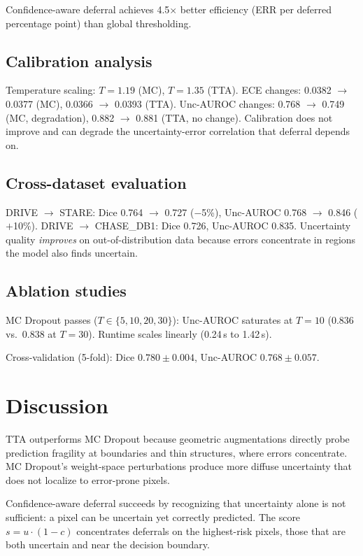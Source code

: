 \documentclass[journal]{IEEEtran}
\begin{document}
Confidence-aware deferral achieves 4.5$\times$ better efficiency (ERR per
deferred percentage point) than global thresholding.

\subsection{Calibration analysis}

Temperature scaling: $T = 1.19$ (MC), $T = 1.35$ (TTA). ECE changes:
0.0382 $\to$ 0.0377 (MC), 0.0366 $\to$ 0.0393 (TTA). Unc-AUROC changes:
0.768 $\to$ 0.749 (MC, degradation), 0.882 $\to$ 0.881 (TTA, no change).
Calibration does not improve and can degrade the uncertainty-error correlation
that deferral depends on.

\subsection{Cross-dataset evaluation}

DRIVE $\to$ STARE: Dice 0.764 $\to$ 0.727 ($-$5\%), Unc-AUROC 0.768 $\to$
0.846 ($+$10\%). DRIVE $\to$ CHASE\_DB1: Dice 0.726, Unc-AUROC 0.835.
Uncertainty quality \emph{improves} on out-of-distribution data because errors
concentrate in regions the model also finds uncertain.

\subsection{Ablation studies}

MC Dropout passes ($T \in \{5, 10, 20, 30\}$): Unc-AUROC saturates at $T = 10$
(0.836 vs.\ 0.838 at $T = 30$). Runtime scales linearly (0.24\,s to 1.42\,s).

Cross-validation (5-fold): Dice $0.780 \pm 0.004$, Unc-AUROC
$0.768 \pm 0.057$.

\section{Discussion}

TTA outperforms MC Dropout because geometric augmentations directly probe
prediction fragility at boundaries and thin structures, where errors
concentrate. MC Dropout's weight-space perturbations produce more diffuse
uncertainty that does not localize to error-prone pixels.

Confidence-aware deferral succeeds by recognizing that uncertainty alone is
not sufficient: a pixel can be uncertain yet correctly predicted. The score
$s = u \cdot (1-c)$ concentrates deferrals on the highest-risk pixels,
those that are both uncertain and near the decision boundary.
\end{document}
